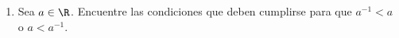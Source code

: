 \begin{enumerate}[label=\alph*)]






\item Sea $a\in \R$. Encuentre las condiciones que deben cumplirse para que $a^{-1}<a$ o $a<a^{-1}$.
 

\end{enumerate}
